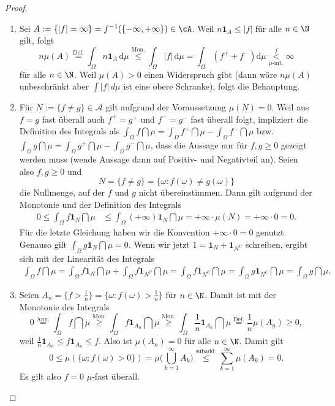 \begin{proof}\abs
	\begin{enumerate}[label=(\roman*)]
		\item Sei $A := \{ |f| = \infty \} = f^{-1}(\{ -\infty, +\infty \}) \in \cA$. Weil  $ n \mathbf{1}_A \leq |f| $ f\"ur alle $n\in\N$ gilt, folgt \[ n \mu(A) \overset{\text{Def.}}{=} \int_{\Omega} n \mathbf{1}_A\, \mathrm{d}\mu \overset{\text{Mon.}}{\leq} \int_{\Omega} |f|\, \mathrm{d}\mu= \int_\Omega(f^++f^-)\mathrm{d}\mu \overset{f}{\underset{\mu\text{-int.}}{<}} \infty \] f\"ur alle $n\in\N$.
		Weil $\mu(A) > 0$ einen Widerspruch gibt (dann w\"are $n \mu(A)$ unbeschr\"ankt aber $\int |f|\,d\mu$ ist eine obere Schranke), folgt die Behauptung.
		\item F\"ur $N:=\{ f\neq g\}\in \mathcal A$ gilt aufgrund der Voraussetzung $\mu(N)=0$.
			Weil aus $ f=g $ fast überall auch $f^+ = g^+ $ und $ f^- = g^- $ fast \"uberall folgt, impliziert die Definition des Integrals als $\int_{\Omega} f \dint \mu = \int_{\Omega} f^+ \dint \mu - \int_{\Omega} f^- \dint \mu$ bzw. $\int_{\Omega} g \dint \mu = \int_{\Omega} g^+ \dint \mu - \int_{\Omega} g^- \dint \mu$, dass die Aussage nur für $f,g\geq0$ gezeigt werden muss (wende Aussage dann auf Positiv- und Negativteil an). Seien also $f,g \geq 0 $ und $$N = \{ f\neq g  \} = \{ \omega \colon f(\omega) \neq g(\omega) \}$$ die Nullmenge, auf der $f$ und $g$ nicht \"ubereinstimmen. Dann gilt aufgrund der Monotonie und der Definition des Integrals
		\begin{align*}
			0\leq \int_\Omega f\mathbf 1_{N}\dint \mu &\leq \int_\Omega (+\infty) \mathbf 1_{N}\dint \mu=+\infty \cdot \mu(N)=+\infty \cdot 0=0.
		\end{align*}
		F\"ur die letzte Gleichung haben wir die Konvention $+\infty\cdot 0=0$ genutzt. Genauso gilt $\int_\Omega g \mathbf 1_{N} \dint \mu=0$. Wenn wir jetzt $1=\mathbf 1_N+\mathbf 1_{N^C}$ schreiben, ergibt sich mit der Linearit\"at des Integrals
		\begin{align*}
			\int_\Omega f\dint \mu= \int_\Omega f\mathbf 1_{N} \dint \mu+\int_\Omega f \mathbf 1_{N^C}\dint \mu=\int_\Omega f\mathbf 1_{N^C} \dint \mu=\int_\Omega g\mathbf 1_{N^C} \dint \mu=\int_\Omega g\dint \mu.
		\end{align*} 
		\item Seien $A_n = \{ f > \frac{1}{n} \} = \{ \omega \colon f(\omega) > \frac{1}{n} \}$ f\"ur $n\in\N$. Damit ist mit der Monotonie des Integrals
		\[ 0 \overset{\text{Ann.}}{=} \int_{\Omega} f \dint \mu \overset{\text{Mon.}}{\geq} \int_{\Omega} f \mathbf{1}_{A_n} \dint \mu \overset{\text{Mon.}}{\geq} \int_{\Omega} \frac{1}{n} \mathbf{1}_{A_n} \dint \mu\overset{\text{Def.}}{=} \frac 1 n \mu(A_n)\geq 0, \]
		weil $\frac{1}{n} \mathbf{1}_{A_n} \leq f \mathbf{1}_{A_n}\leq f$. Also ist $\mu(A_n) = 0$ f\"ur alle $n\in\N$. Damit gilt
				\[  0\leq \mu( \{ \omega\colon f(\omega) > 0 \}) = \mu\Big( \bigcup\limits_{k=1}^{\infty} A_k \Big) \overset{\text{subadd.}}{\leq} \sum\limits_{k=1}^{\infty} \mu(A_k) = 0. \]
		Es gilt also $f=0$ $\mu$-fast überall.
	\end{enumerate}
\end{proof}
